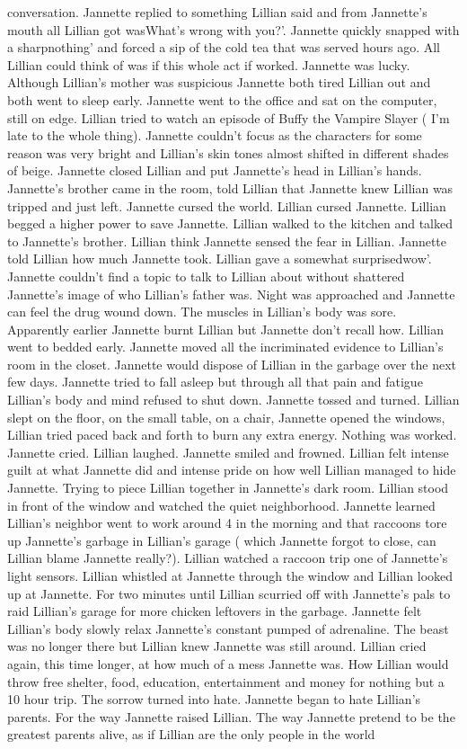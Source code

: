 \documentclass[12pt]{book}
\begin{document}
conversation. Jannette replied to something Lillian said and from Jannette's mouth all Lillian got wasWhat's wrong with you?'. Jannette quickly snapped with a sharpnothing' and forced a sip of the cold tea that was served hours ago. All Lillian could think of was if this whole act if worked. Jannette was lucky. Although Lillian's mother was suspicious Jannette both tired Lillian out and both went to sleep early. Jannette went to the office and sat on the computer, still on edge. Lillian tried to watch an episode of Buffy the Vampire Slayer ( I'm late to the whole thing). Jannette couldn't focus as the characters for some reason was very bright and Lillian's skin tones almost shifted in different shades of beige. Jannette closed Lillian and put Jannette's head in Lillian's hands. Jannette's brother came in the room, told Lillian that Jannette knew Lillian was tripped and just left. Jannette cursed the world. Lillian cursed Jannette. Lillian begged a higher power to save Jannette. Lillian walked to the kitchen and talked to Jannette's brother. Lillian think Jannette sensed the fear in Lillian. Jannette told Lillian how much Jannette took. Lillian gave a somewhat surprisedwow'. Jannette couldn't find a topic to talk to Lillian about without shattered Jannette's image of who Lillian's father was. Night was approached and Jannette can feel the drug wound down. The muscles in Lillian's body was sore. Apparently earlier Jannette burnt Lillian but Jannette don't recall how. Lillian went to bedded early. Jannette moved all the incriminated evidence to Lillian's room in the closet. Jannette would dispose of Lillian in the garbage over the next few days. Jannette tried to fall asleep but through all that pain and fatigue Lillian's body and mind refused to shut down. Jannette tossed and turned. Lillian slept on the floor, on the small table, on a chair, Jannette opened the windows, Lillian tried paced back and forth to burn any extra energy. Nothing was worked. Jannette cried. Lillian laughed. Jannette smiled and frowned. Lillian felt intense guilt at what Jannette did and intense pride on how well Lillian managed to hide Jannette. Trying to piece Lillian together in Jannette's dark room. Lillian stood in front of the window and watched the quiet neighborhood. Jannette learned Lillian's neighbor went to work around 4 in the morning and that raccoons tore up Jannette's garbage in Lillian's garage ( which Jannette forgot to close, can Lillian blame Jannette really?). Lillian watched a raccoon trip one of Jannette's light sensors. Lillian whistled at Jannette through the window and Lillian looked up at Jannette. For two minutes until Lillian scurried off with Jannette's pals to raid Lillian's garage for more chicken leftovers in the garbage. Jannette felt Lillian's body slowly relax Jannette's constant pumped of adrenaline. The beast was no longer there but Lillian knew Jannette was still around. Lillian cried again, this time longer, at how much of a mess Jannette was. How Lillian would throw free shelter, food, education, entertainment and money for nothing but a 10 hour trip. The sorrow turned into hate. Jannette began to hate Lillian's parents. For the way Jannette raised Lillian. The way Jannette pretend to be the greatest parents alive, as if Lillian are the only people in the world 
\end{document}
